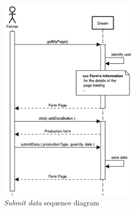 \begin{enumerate}
        \begin{figure}[H]
            \begin{center}
            \includegraphics[width=0.6\textwidth]{sequence/AddData.png}
            \caption{\emph{Submit data} sequence diagram}
            \label{fig:sequence4}
        \end{center}
        \end{figure}
    


\end{enumerate}
